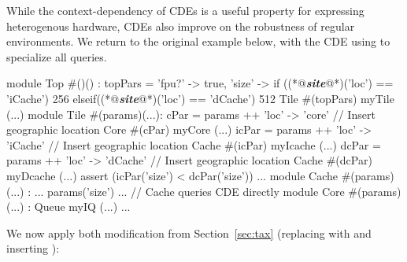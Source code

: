
While the context-dependency of CDEs is a useful property for expressing heterogenous hardware, CDEs also improve on the robustness of regular environments. We return to the original example below, with the CDE  using  to specialize all  queries.

\begin{phdl}
module Top #()() :
  topPars = {'fpu?' -> true,
             'size' -> if    ((*@\textcolor[rgb]{1,0.5,0}{\textbf{\textit{site}}}@*)('loc') == 'iCache') 256 
                       elseif((*@\textcolor[rgb]{1,0.5,0}{\textbf{\textit{site}}}@*)('loc') == 'dCache') 512}
  Tile #(topPars) myTile (...)
module Tile #(params)(...):
  cPar  = params ++ {'loc' -> 'core'}   // Insert geographic location
  Core #(cPar) myCore (...)
  icPar = params ++ {'loc' -> 'iCache'} // Insert geographic location
  Cache #(icPar) myIcache (...)
  dcPar = params ++ {'loc' -> 'dCache'} // Insert geographic location
  Cache #(dcPar) myDcache (...)
  assert (icPar('size') < dcPar('size')) ...
module Cache #(params)(...) : 
   ... params('size') ...               // Cache queries CDE directly
module Core  #(params)(...) :
  Queue myIQ (...) ...
\end{phdl} 

We now apply both modification from Section~\ref{sec:tax} (replacing  with  and inserting ):

